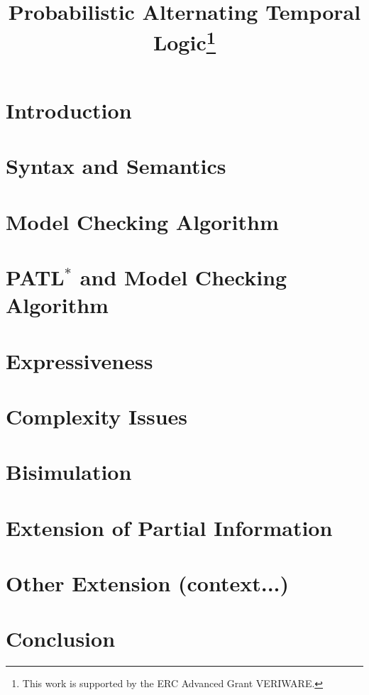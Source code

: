 \documentclass{llncs}
\begin{document}
 
\title{Probabilistic Alternating Temporal Logic\thanks{This work is supported by
the ERC Advanced Grant VERIWARE.}}
 
\author{}
\email{}

\maketitle
 
\begin{abstract}
 
\end{abstract}
 
\section{Introduction}
 
\section{Syntax and Semantics}

\section{Model Checking Algorithm}

\section{PATL$^*$ and Model Checking Algorithm}

\section{Expressiveness}

\section{Complexity Issues}

\section{Bisimulation}

\section{Extension of Partial Information}

\section{Other Extension (context...)}

\section{Conclusion}
\end{document}
